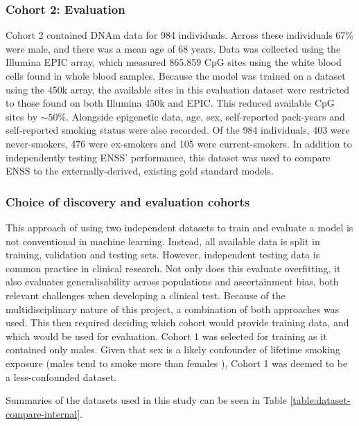 \documentclass{article} %
\begin{document}
\subsubsection{Cohort 2: Evaluation}
Cohort 2 contained DNAm data for 984 individuals. Across these individuals 67\% were male, and there was a mean age of 68 years. Data was collected using the Illumina EPIC array, which measured \num{865,859} CpG sites using the white blood cells found in whole blood samples. Because the model was trained on a dataset using the 450k array, the available sites in this evaluation dataset were restricted to those found on both Illumina 450k and EPIC. This reduced available CpG sites by \(\sim\!50\%\). Alongside epigenetic data, age, sex, self-reported pack-years and self-reported smoking status were also recorded. Of the 984 individuals, 403 were never-smokers, 476 were ex-smokers and 105 were current-smokers. In addition to independently testing ENSS' performance, this dataset was used to compare ENSS to the externally-derived, existing gold standard models.

\subsubsection{Choice of discovery and evaluation cohorts}
This approach of using two independent datasets to train and evaluate a model is not conventional in machine learning. Instead, all available data is split in training, validation and testing sets. However, independent testing data is common practice in clinical research. Not only does this evaluate overfitting, it also evaluates generalisability across populations and ascertainment bias, both relevant challenges when developing a clinical test. Because of the multidisciplinary nature of this project, a combination of both approaches was used. This then required deciding which cohort would provide training data, and which would be used for evaluation. Cohort 1 was selected for training as it contained only males. Given that sex is a likely confounder of lifetime smoking exposure (males tend to smoke more than females \cite{WHO2021Tobacco, higgins2015literature}), Cohort 1 was deemed to be a less-confounded dataset.

Summaries of the datasets used in this study can be seen in Table \ref{table:dataset-compare-internal}.

\end{document}
